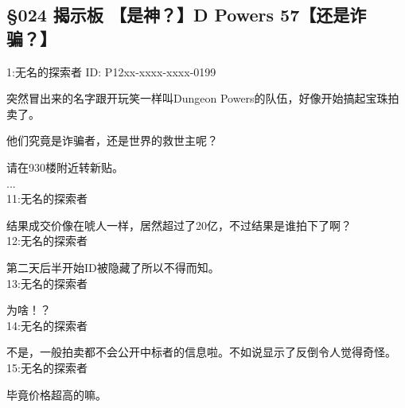 \subsection{§024 揭示板 【是神？】D Powers 57【还是诈骗？】}

1:无名的探索者 ID: P12xx-xxxx-xxxx-0199

突然冒出来的名字跟开玩笑一样叫Dungeon Powers的队伍，好像开始搞起宝珠拍卖了。

他们究竟是诈骗者，还是世界的救世主呢？

请在930楼附近转新贴。\\

...\\

11:无名的探索者

结果成交价像在唬人一样，居然超过了20亿，不过结果是谁拍下了啊？\\

12:无名的探索者

第二天后半开始ID被隐藏了所以不得而知。\\

13:无名的探索者

为啥！？\\

14:无名的探索者

不是，一般拍卖都不会公开中标者的信息啦。不如说显示了反倒令人觉得奇怪。\\

15:无名的探索者

毕竟价格超高的嘛。\\

